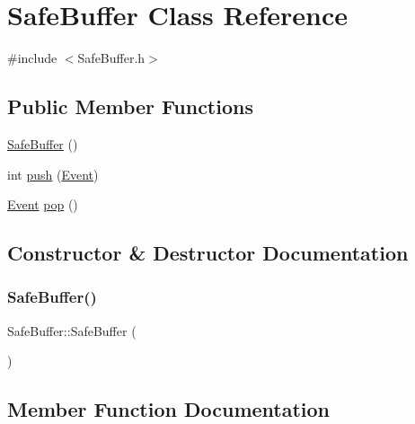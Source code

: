 \hypertarget{class_safe_buffer}{}\section{Safe\+Buffer Class Reference}
\label{class_safe_buffer}


{\ttfamily \#include $<$Safe\+Buffer.\+h$>$}

\subsection*{Public Member Functions}
\begin{DoxyCompactItemize}
\item 
\hyperlink{class_safe_buffer_af835d8d08c4dcd3326f21ae2e9988699}{Safe\+Buffer} ()
\item 
int \hyperlink{class_safe_buffer_ac3ed0799ec2e84c97e36b22c83f7abf5}{push} (\hyperlink{class_event}{Event})
\item 
\hyperlink{class_event}{Event} \hyperlink{class_safe_buffer_a90a33fca4d838f7c0eef6e8557f3c281}{pop} ()
\end{DoxyCompactItemize}


\subsection{Constructor \& Destructor Documentation}
\mbox{\label{class_safe_buffer_af835d8d08c4dcd3326f21ae2e9988699}} 
\subsubsection{\texorpdfstring{Safe\+Buffer()}{SafeBuffer()}}
{\footnotesize\ttfamily Safe\+Buffer\+::\+Safe\+Buffer (\begin{DoxyParamCaption}{ }\end{DoxyParamCaption})}



\subsection{Member Function Documentation}
\mbox{\label{class_safe_buffer_a90a33fca4d838f7c0eef6e8557f3c281}} 
